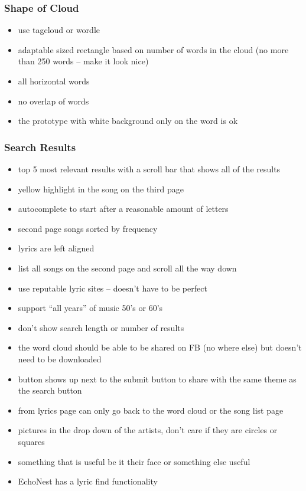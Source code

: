 \documentclass[]{article}
\begin{document}
\subsubsection{Shape of Cloud}\label{shape-of-cloud}

\begin{itemize}
\itemsep1pt\parskip0pt
\item
  use tagcloud or wordle
\item
  adaptable sized rectangle based on number of words in the cloud (no
  more than 250 words -- make it look nice)
\item
  all horizontal words
\item
  no overlap of words
\item
  the prototype with white background only on the word is ok
\end{itemize}

\subsubsection{Search Results}\label{search-results}

\begin{itemize}
\itemsep1pt\parskip0pt
\item
  top 5 most relevant results with a scroll bar that shows all of the
  results
\item
  yellow highlight in the song on the third page
\item
  autocomplete to start after a reasonable amount of letters
\item
  second page songs sorted by frequency
\item
  lyrics are left aligned
\item
  list all songs on the second page and scroll all the way down
\item
  use reputable lyric sites -- doesn't have to be perfect
\item
  support ``all years'' of music 50's or 60's
\item
  don't show search length or number of results
\item
  the word cloud should be able to be shared on FB (no where else) but
  doesn't need to be downloaded
\item
  button shows up next to the submit button to share with the same theme
  as the search button
\item
  from lyrics page can only go back to the word cloud or the song list
  page
\item
  pictures in the drop down of the artists, don't care if they are
  circles or squares
\item
  something that is useful be it their face or something else useful
\item
  EchoNest has a lyric find functionality
\end{itemize}
\end{document}
